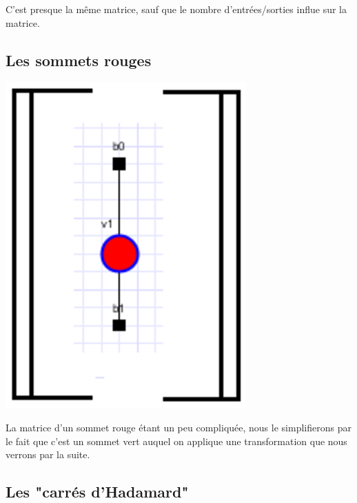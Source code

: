 \documentclass[a4paper,oneside]{book}
\begin{document}
C'est presque la même matrice, sauf que le nombre d'entrées/sorties influe sur la matrice.

\subsection{Les sommets rouges}

\begin{center}
\includegraphics[scale=0.6]{IMG/sommetRouge.eps}
\label{sommetRouge}
\end{center}

La matrice d'un sommet rouge étant un peu compliquée, nous le simplifierons par le fait que c'est un sommet vert auquel on applique une transformation que nous verrons par la suite.

\subsection{Les "carrés d'Hadamard"}
\end{document}
